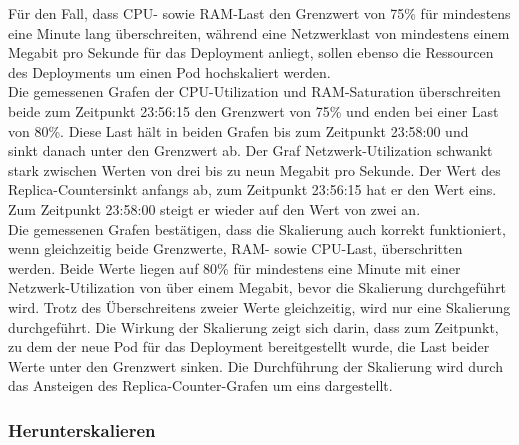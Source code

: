 \documentclass[a4paper,10pt]{scrartcl}
\begin{document}
\begin{description}
Für den Fall, dass CPU- sowie RAM-Last den Grenzwert von 75\% für mindestens eine Minute lang überschreiten, während eine Netzwerklast von mindestens einem Megabit pro Sekunde für das Deployment anliegt, sollen ebenso die Ressourcen des Deployments um einen Pod hochskaliert werden.\\
Die gemessenen Grafen der CPU-Utilization und RAM-Saturation überschreiten beide zum Zeitpunkt 23:56:15 den Grenzwert von 75\% und enden bei einer Last von 80\%. Diese Last hält in beiden Grafen bis zum Zeitpunkt 23:58:00 und \\sinkt danach unter den Grenzwert ab.
Der Graf Netzwerk-Utilization schwankt stark zwischen Werten von drei bis zu neun Megabit pro Sekunde. Der Wert des \glqq Replica-Counter\grqq sinkt anfangs ab, zum Zeitpunkt 23:56:15 hat er den Wert eins. Zum Zeitpunkt 23:58:00 steigt er wieder auf den Wert von zwei an.\\
Die gemessenen Grafen bestätigen, dass die Skalierung auch korrekt funktioniert, wenn gleichzeitig beide Grenzwerte, RAM- sowie CPU-Last, überschritten werden. Beide Werte liegen auf 80\% für mindestens eine Minute mit einer Netzwerk-Utilization von über einem Megabit, bevor die Skalierung durchgeführt wird. Trotz des Überschreitens zweier Werte gleichzeitig, wird nur eine Skalierung durchgeführt. Die Wirkung der Skalierung zeigt sich darin, dass zum Zeitpunkt, zu dem der neue Pod für das Deployment bereitgestellt wurde, die Last beider Werte unter den Grenzwert sinken. Die Durchführung der Skalierung wird durch das Ansteigen des \glqq Replica-Counter\grqq -Grafen um eins dargestellt.

\end{description}

\pagebreak

\subsubsection{Herunterskalieren}
\end{document}
